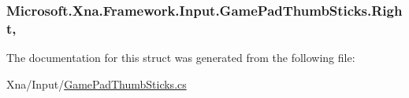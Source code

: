 \subsubsection[{Right}]{ Microsoft.\+Xna.\+Framework.\+Input.\+Game\+Pad\+Thumb\+Sticks.\+Right\hspace{0.3cm}{\ttfamily [get]}, {\ttfamily [set]}}\label{struct_microsoft_1_1_xna_1_1_framework_1_1_input_1_1_game_pad_thumb_sticks_a44bf0505970c4f29912234dad5cf9e6f}


The documentation for this struct was generated from the following file\+:\begin{DoxyCompactItemize}
\item 
Xna/\+Input/\hyperlink{_game_pad_thumb_sticks_8cs}{Game\+Pad\+Thumb\+Sticks.\+cs}\end{DoxyCompactItemize}
